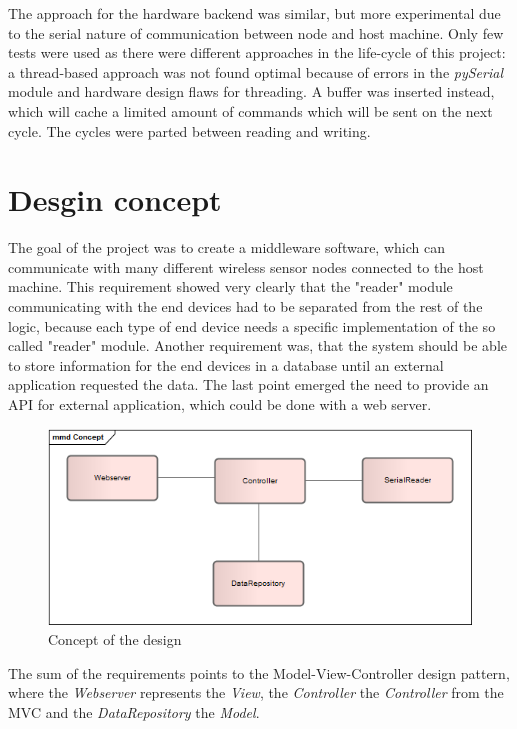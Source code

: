 The approach for the hardware backend was similar, but more experimental due to the serial nature of communication between node and host machine. Only
few tests were used as there were different approaches in the life-cycle of this project: a thread-based approach was not found optimal because 
of errors in the \textit{pySerial} module and hardware design flaws for threading. A buffer was inserted instead, which will cache a limited amount of commands which
will be sent on the next cycle. The cycles were parted between reading and writing.

\section{Desgin concept}
The goal of the project was to create a middleware software, which can communicate with many different wireless sensor nodes connected to the host machine. This requirement showed very clearly that the "reader" module communicating with the end devices had to be separated from the rest of the logic, because each type of end device needs a specific implementation of the so called "reader" module. Another requirement was, that the system should be able to store information for the end devices in a database until an external application requested the data. The last point emerged the need to provide an API for external application, which could be done with a web server.


\begin{figure}[H]
	\centering
	\includegraphics[width=1.0\textwidth]{pic/Concept.png}%
    \caption{Concept of the design}
    \label{Conceptpic}%
\end{figure}

The sum of the requirements points to the Model-View-Controller design pattern, where the \textit{Webserver} represents the \textit{View}, the \textit{Controller} the \textit{Controller} from the MVC and the \textit{DataRepository} the \textit{Model}.


